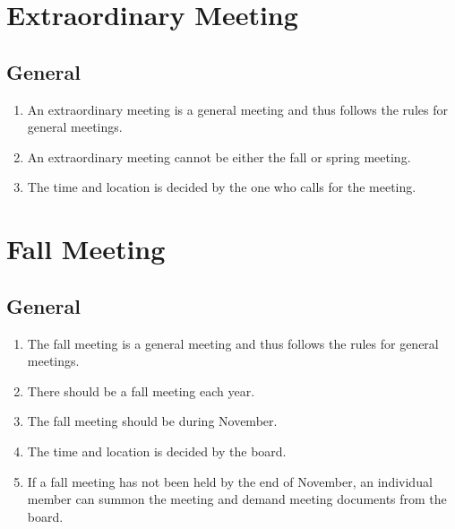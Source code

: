 \section*{Extraordinary Meeting}
\subsection{General}
\begin{enumerate}
  \item An extraordinary meeting is a general meeting and thus follows the rules for general meetings.
  \item An extraordinary meeting cannot be either the fall or spring meeting.
  \item The time and location is decided by the one who calls for the meeting.
\end{enumerate}

\section*{Fall Meeting}
\subsection{General}
\begin{enumerate}
  \item The fall meeting is a general meeting and thus follows the rules for general meetings.
  \item There should be a fall meeting each year.
  \item The fall meeting should be during November.
  \item The time and location is decided by the board.
  \item If a fall meeting has not been held by the end of November, an individual member can summon the meeting and demand meeting documents from the board.
\end{enumerate}

